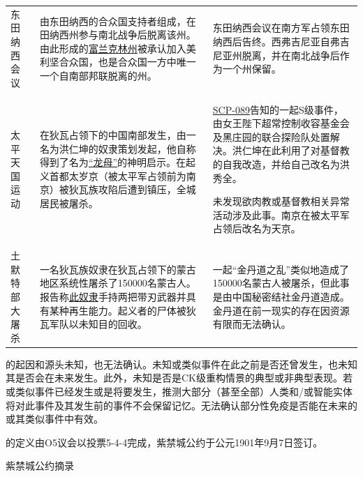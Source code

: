 \begin{longtable}{m{}m{}m{}}
东田纳西会议 & 由东田纳西的合众国支持者组成，在田纳西州参与南北战争后脱离该州。由此形成的\hyperref[chap:SCP-1328]{富兰克林州}被承认加入美利坚合众国，也是合众国一方中唯一一个自南部邦联脱离的州。& 东田纳西会议在南方军占领东田纳西后告终。西弗吉尼亚自弗吉尼亚州脱离，并在南北战争后作为一个州保留。\\
太平天国运动 & 在狄瓦占领下的中国南部发生，由一名为洪仁坤的奴隶策划发起，他自称得到了名为\hyperref[doc:2481]{“龙母”}的神明启示。在起义首都太岁京（被太平军占领前为南京）被狄瓦族攻陷后遭到镇压，全城居民被屠杀。& \hyperref[chap:SCP-089]{SCP-089}告知的一起S级事件，由女王陛下超常控制收容基金会及黑庄园的联合探险队处置解决。洪仁坤在此利用了对基督教的自我改造，并给自己改名为洪秀全。\par 未发现欲肉教或基督教相关异常活动涉及此事。南京在被太平军占领后改名为天京。\\
土默特部大屠杀 & 一名狄瓦族奴隶在狄瓦占领下的蒙古地区系统性屠杀了150000名蒙古人。报告称\hyperref[chap:SCP-076]{此奴隶}手持两把带刃武器并具有某种再生能力。起义者的尸体被狄瓦军队以未知目的回收。& 一起“金丹道之乱”类似地造成了150000名蒙古人被屠杀，但此事是由中国秘密结社金丹道造成。金丹道在前一现实的存在因资源有限而无法确认。
\end{longtable}

的起因和源头未知，也无法确认。未知或类似事件在此之前是否还曾发生，也未知其是否会在未来发生。此外，未知是否是CK级重构情景的典型或非典型表现。若或类似事件已经发生或是将要发生，推测大部分（甚至全部）人类和/或智能实体将对此事件及其发生前的事件不会保留记忆。无法确认部分性免疫是否能在未来的或其类似事件中有效。

的定义由O5议会以投票5-4-4完成，紫禁城公约于公元1901年9月7日签订。

紫禁城公约摘录


